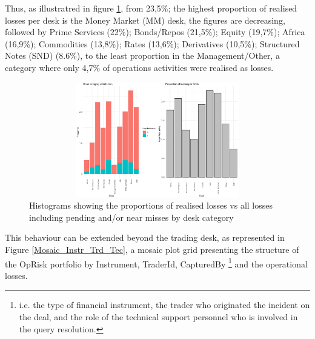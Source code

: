 \documentclass[]{DissertateUSU}
\let\rmarkdownfootnote\footnote%
\def\footnote{\protect\rmarkdownfootnote}
\begin{document}
Thus, as illustratred in figure \ref{Desk_Proportions}, from 23,5\%; the
highest proportion of realised losses per desk is the Money Market (MM)
desk, the figures are decreasing, followed by Prime Services (22\%);
Bonds/Repos (21,5\%); Equity (19,7\%); Africa (16,9\%); Commodities
(13,8\%); Rates (13,6\%); Derivatives (10,5\%); Structured Notes (SND)
(8.6\%), to the least proportion in the Management/Other, a category
where only 4,7\% of operations activities were realised as losses.

\singlespacing

\doublespacing

\begin{figure}
\centering
\includegraphics[width=20cm,height=5cm]{Exploratory_Desk_Proportions.eps}
\caption[Desk category by realised losses]{Histograms showing the proportions of realised losses vs all losses including pending and/or near misses by desk category}
\label{Desk_Proportions}
\end{figure}

This behaviour can be extended beyond the trading desk, as represented
in Figure \ref{Mosaic_Instr_Trd_Tec}, a mosaic plot grid presenting the
structure of the OpRisk portfolio by Instrument, TraderId, CapturedBy
\footnote{i.e. the type of financial instrument, the trader who originated the incident on the deal, and the role of the technical support personnel who is involved in the query resolution.}
and the operational losses.

\singlespacing

\doublespacing
\end{document}
